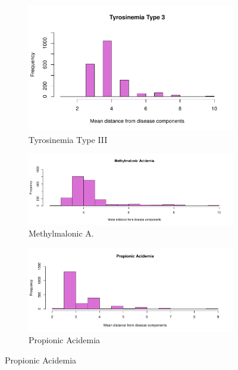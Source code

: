 \begin{figure}[h!]
\begin{subfigure}[b]{0.3\textwidth}
         \includegraphics[scale=0.25]{Images/Tyrosinemia Type III.pdf}
         \caption{Tyrosinemia Type III}
         \label{fig:Tyrosinemia Type III}
     \end{subfigure}
     \hfill
     \begin{subfigure}[b]{0.3\textwidth}
         \centering
         \includegraphics[scale=0.25]{Images/Methylmalonic Acidemia.pdf}
         \caption{Methylmalonic A.}
         \label{fig:Methylmalonic Acidemia}
     \end{subfigure}
     \hfill
     \begin{subfigure}[b]{0.3\textwidth}
         \centering
         \includegraphics[scale=0.25]{Images/Propionic Acidemia.pdf}
         \caption{Propionic Acidemia}
         \label{fig:Propionic Acidemia}
     \end{subfigure}

\end{figure}
